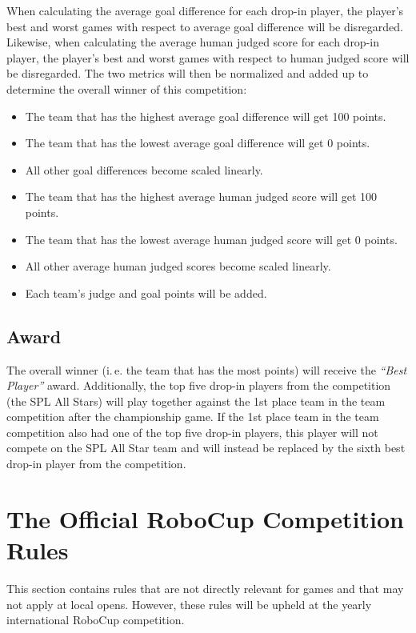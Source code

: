 \documentclass[12pt]{article}
\newcommand{\ie}{\mbox{i.\,e.}\xspace}
\begin{document}
When calculating the average goal difference for each drop-in player, the player's best and worst games with respect to average goal difference will be disregarded.  Likewise, when calculating the average human judged score for each drop-in player, the player's best and worst games with respect to human judged score will be disregarded.  The two metrics will then be normalized and added up to determine the overall winner of this competition:
\begin{itemize}
\item The team that has the highest average goal difference will get 100 points.
\item The team that has the lowest average goal difference will get 0 points.
\item All other goal differences become scaled linearly. 
\item The team that has the highest average human judged score will get 100 points.
\item The team that has the lowest average human judged score will get 0 points.
\item All other average human judged scores become scaled linearly. 
\item Each team's judge and goal points will be added.
\end{itemize}


\subsection{Award}
The overall winner (\ie the team that has the most points) will receive the \textit{``Best Player''} award.  Additionally, the top five drop-in players from the competition (the SPL All Stars) will play together against the 1st place team in the team competition after the championship game.  If the 1st place team in the team competition also had one of the top five drop-in players, this player will not compete on the SPL All Star team and will instead be replaced by the sixth best drop-in player from the competition.


\newpage


\section{The Official RoboCup Competition Rules}
\label{sec:comRules}
This section contains rules that are not directly relevant for games and that may not apply at local opens.  However, these rules will be upheld at the yearly international RoboCup competition.
\end{document}

